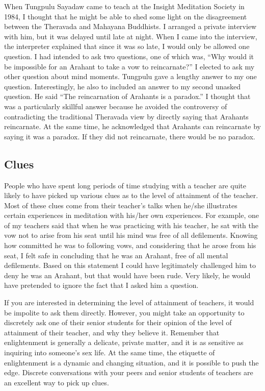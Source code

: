\documentclass[a5paper,10pt,english]{book}
\begin{document}
\sphinxAtStartPar
When Tungpulu Sayadaw came to teach at the Insight Meditation Society in
1984, I thought that he might be able to shed some light on the
disagreement between the Theravada and Mahayana Buddhists. I arranged a
private interview with him, but it was delayed until late at night. When
I came into the interview, the interpreter explained that since it was
so late, I would only be allowed one question. I had intended to ask two
questions, one of which was, “Why would it be impossible for an Arahant
to take a vow to reincarnate?” I elected to ask my other question about
mind moments. Tungpulu gave a lengthy answer to my one question.
Interestingly, he also to included an answer to my second unasked
question. He said “The reincarnation of Arahants is a paradox.” I
thought that was a particularly skillful answer because he avoided the
controversy of contradicting the traditional Theravada view by directly
saying that Arahants reincarnate. At the same time, he acknowledged that
Arahants can reincarnate by saying it was a paradox. If they did not
reincarnate, there would be no paradox.


\subsection{Clues}
\label{\detokenize{saints:clues}}
\sphinxAtStartPar
People who have spent long periods of time studying with a teacher are
quite likely to have picked up various clues as to the level of
attainment of the teacher. Most of these clues come from their teacher’s
talks when he/she illustrates certain experiences in
meditation with his/her own experiences. For example, one of my teachers
said that when he was practicing with his teacher, he sat with the vow
not to arise from his seat until his mind was free of all defilements.
Knowing how committed he was to following vows, and considering that he
arose from his seat, I felt safe in concluding that he was an Arahant,
free of all mental defilements. Based on this statement I could have
legitimately challenged him to deny he was an Arahant, but that would
have been rude. Very likely, he would have pretended to ignore the fact
that I asked him a question.

\sphinxAtStartPar
If you are interested in determining the level of attainment of
teachers, it would be impolite to ask them directly. However, you might
take an opportunity to discretely ask one of their senior students for
their opinion of the level of attainment of their teacher, and why they
believe it. Remember that enlightenment is generally a delicate, private
matter, and it is as sensitive as inquiring into someone’s sex life. At
the same time, the etiquette of enlightenment is a dynamic and changing
situation, and it is possible to push the edge. Discrete conversations
with your peers and senior students of teachers are an excellent way to
pick up clues.
\end{document}
